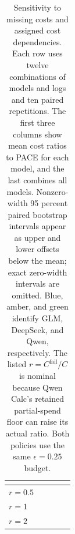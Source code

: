 \begin{table}[htbp]
\centering
\caption{Sensitivity to missing costs and assigned cost dependencies.
Each row uses twelve combinations of models and logs and ten paired repetitions.
The first three columns show mean cost ratios to PACE for each model, and the last combines all models.
Nonzero-width 95 percent paired bootstrap intervals appear as upper and lower offsets below the mean; exact zero-width intervals are omitted.
Blue, amber, and green identify GLM, DeepSeek, and Qwen, respectively.
The listed $r=C^{\mathrm{fail}}/C$ is nominal because Qwen Calc's retained partial-spend floor can raise its actual ratio.
Both policies use the same $\epsilon=0.25$ budget.}
\label{tab:price-sensitivity}
\tablefont
\setlength{\tabcolsep}{2pt}
\renewcommand{\arraystretch}{0.95}
\begin{tabular}{@{}lrrrr@{}}
\toprule
{} &  &  &  &  \\
\midrule
$r=0.5$ &  &  &  &  \\
$r=1$ &  &  &  &  \\
$r=2$ &  &  &  &  \\

\end{tabular}
\end{table}
